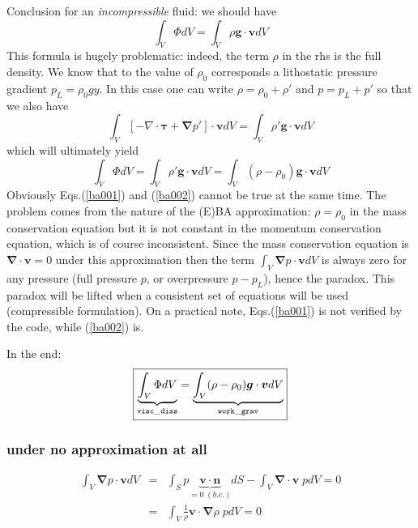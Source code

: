 Conclusion for an {\it incompressible} fluid: we should have
\begin{equation}
\int_V \Phi  dV 
=
\int_V \rho {\bm g} \cdot {\bm v} dV 
\label{ba001}
\end{equation}
This formula is hugely problematic: indeed, the term $\rho$ in the rhs is the full density. We know 
that to the value of $\rho_0$ corresponds a lithostatic pressure gradient $p_L=\rho_0 g y$. In this case one can write $\rho = \rho_0 + \rho'$ and $p=p_L + p'$
so that we also have 
\[
\int_V  \left[ -\nabla \cdot {\bm \tau}  + {\bm \nabla} p' \right] \cdot {\bm v} dV  = \int_V  \rho' {\bm g} \cdot {\bm v}dV
\]
which will ultimately yield 
\begin{equation}
\int_V \Phi  dV 
=
\int_V \rho' {\bm g} \cdot {\bm v} dV 
=
\int_V (\rho-\rho_0) {\bm g} \cdot {\bm v} dV 
\label{ba002}
\end{equation}
Obviously Eqs.(\ref{ba001}) and (\ref{ba002}) cannot be true at the same time.
The problem comes from the nature of the (E)BA approximation: $\rho=\rho_0$ in the mass conservation equation
but it is not constant in the momentum conservation equation, which is of course inconsistent. Since the mass 
conservation equation is ${\bm \nabla}\cdot{\bm v}=0$ under this approximation then the term 
$\int_V {\bm \nabla} p \cdot {\bm v} dV$ is always zero for any pressure (full pressure $p$, or overpressure $p-p_L$), 
hence the paradox. This paradox will be lifted when a consistent set of equations will be used (compressible formulation).
On a practical note, Eqs.(\ref{ba001}) is not verified by the code, while (\ref{ba002}) is.   

In the end:
\begin{equation}
\boxed{
\underbrace{\int_V \Phi  dV }_{\tt visc\_diss}
=
\underbrace{\int_V (\rho-\rho_0) {\bm g} \cdot {\bm v} dV }_{\tt work\_grav}
}
\label{ba003}
\end{equation}


\subsubsection*{under no  approximation at all}

\begin{eqnarray}
\int_V {\bm \nabla} p \cdot {\bm v} dV  
&=& \int_S p \underbrace{{\bm v}\cdot {\bm n}}_{=0 \; (b.c.)} dS - \int_V {\bm \nabla}\cdot{\bm v} \; p dV = 0  \\
&=&  \int_V \frac{1}{\rho} {\bm v} \cdot {\bm \nabla} \rho \; p dV = 0  \\
\end{eqnarray}

